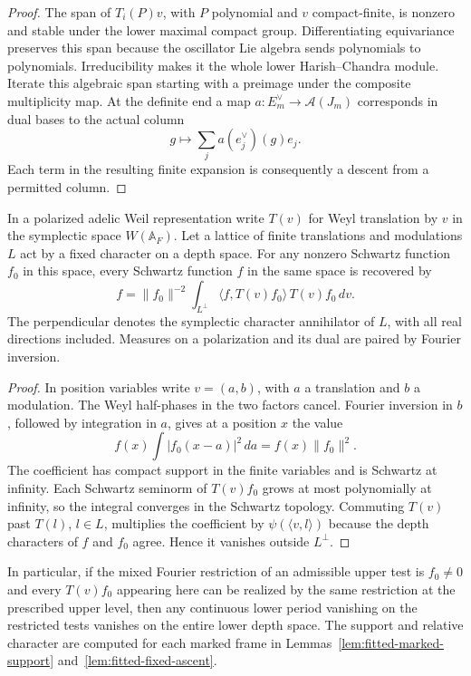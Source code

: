 \begin{proof}
The span of \(T_i(P)v\), with \(P\) polynomial and \(v\) compact-finite,
is nonzero and stable under the lower maximal compact group.
Differentiating equivariance preserves this span because the
oscillator Lie algebra sends polynomials to polynomials. Irreducibility
makes it the whole lower Harish--Chandra module. Iterate this algebraic
span starting with a preimage under the composite multiplicity map.
At the definite end a map \(a:E_m^\vee\to\mathcal A(J_m)\)
corresponds in dual bases to the actual column
\[
                 g\longmapsto \sum_j a(e_j^\vee)(g)e_j .
\]
Each term in the resulting finite expansion is consequently a descent
from a permitted column.
\end{proof}

\begin{auxlemma}\label{lem:fitted-lower-test-recovery}
In a polarized adelic Weil representation write \(T(v)\) for Weyl
translation by \(v\) in the symplectic space \(W(\mathbb A_F)\).
Let a lattice of finite translations and modulations \(L\) act by a
fixed character on a depth space. For any nonzero Schwartz function
\(f_0\) in this space, every Schwartz function \(f\) in the same
space is recovered by
\[
 f=\|f_0\|^{-2}\int_{L^\perp}
          \langle f,T(v)f_0\rangle\,T(v)f_0\,dv .
\]
The perpendicular denotes the symplectic character annihilator of
\(L\), with all real directions included. Measures on a polarization
and its dual are paired by Fourier inversion.
\end{auxlemma}
\begin{proof}
In position variables write \(v=(a,b)\), with \(a\) a translation
and \(b\) a modulation. The Weyl half-phases in the two factors cancel.
Fourier inversion in \(b\), followed by integration in \(a\), gives
at a position \(x\) the value
\[
              f(x)\int |f_0(x-a)|^2\,da=f(x)\|f_0\|^2 .
\]
The coefficient has compact support in the finite variables and is
Schwartz at infinity. Each Schwartz seminorm of \(T(v)f_0\) grows at
most polynomially at infinity, so the integral converges in the
Schwartz topology. Commuting \(T(v)\) past \(T(l)\), \(l\in L\),
multiplies the coefficient by \(\psi(\langle v,l\rangle)\) because
the depth characters of \(f\) and \(f_0\) agree. Hence it vanishes
outside \(L^\perp\).
\end{proof}

In particular, if the mixed Fourier restriction of an admissible
upper test is \(f_0\ne0\) and every \(T(v)f_0\) appearing here can
be realized by the same restriction at the prescribed upper level,
then any continuous lower period vanishing on the restricted
tests vanishes on the entire lower depth space. The support and
relative character are computed for each marked frame in Lemmas~\ref{lem:fitted-marked-support} and~\ref{lem:fitted-fixed-ascent}.

